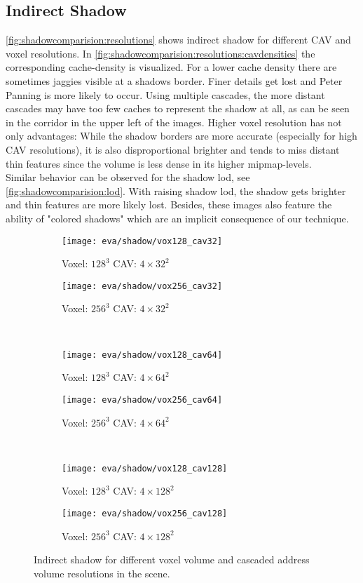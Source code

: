 \documentclass[thesis.tex]{subfiles}
\begin{document}
\subsection{Indirect Shadow}
\autoref{fig:shadowcomparision:resolutions} shows indirect shadow for different CAV and voxel resolutions.
In \autoref{fig:shadowcomparision:resolutions:cavdensities} the corresponding cache-density is visualized.
For a lower cache density there are sometimes jaggies visible at a shadows border.
Finer details get lost and Peter Panning is more likely to occur.
Using multiple cascades, the more distant cascades may have too few caches to represent the shadow at all, as can be seen in the corridor in the upper left of the images.
Higher voxel resolution has not only advantages:
While the shadow borders are more accurate (especially for high CAV resolutions), it is also disproportional brighter and tends to miss distant thin features since the volume is less dense in its higher mipmap-levels.
\\
Similar behavior can be observed for the shadow lod, see \autoref{fig:shadowcomparision:lod}.
With raising shadow lod, the shadow gets brighter and thin features are more likely lost.
Besides, these images also feature the ability of "colored shadows" which are an implicit consequence of our technique.
%
\begin{figure}
\centering
\begin{subfigure}[b]{\halfpageimage}
\texttt{[image: eva/shadow/vox128\_cav32]}
\caption{Voxel: $128^3$ CAV: $4\times32^2$}
\end{subfigure}
\begin{subfigure}[b]{\halfpageimage}
\texttt{[image: eva/shadow/vox256\_cav32]}
\caption{Voxel: $256^3$ CAV: $4\times32^2$}
\end{subfigure}
\\
\begin{subfigure}[b]{\halfpageimage}
\texttt{[image: eva/shadow/vox128\_cav64]}
\caption{Voxel: $128^3$ CAV: $4\times64^2$}
\end{subfigure}
\begin{subfigure}[b]{\halfpageimage}
\texttt{[image: eva/shadow/vox256\_cav64]}
\caption{Voxel: $256^3$ CAV: $4\times64^2$}
\end{subfigure}
\\
\begin{subfigure}[b]{\halfpageimage}
\texttt{[image: eva/shadow/vox128\_cav128]}
\caption{Voxel: $128^3$ CAV: $4\times128^2$}
\end{subfigure}
\begin{subfigure}[b]{\halfpageimage}
\texttt{[image: eva/shadow/vox256\_cav128]}
\caption{Voxel: $256^3$ CAV: $4\times128^2$}
\end{subfigure}
\caption{Indirect shadow for different voxel volume and cascaded address volume resolutions in the  scene.}
\label{fig:shadowcomparision:resolutions}
\end{figure}
\end{document}
